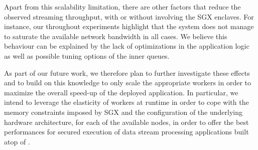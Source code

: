 Apart from this scalability limitation, there are other factors that reduce the observed streaming throughput, with or without involving the SGX enclaves.
For instance, our throughout experiments highlight that the system does not manage to saturate the available network bandwidth in all cases.
We believe this behaviour can be explained by the lack of optimizations in the application logic as well as possible tuning options of the inner \zmq{} queues.

As part of our future work, we therefore plan to further investigate these effects and to build on this knowledge to only scale the appropriate workers in order to maximize the overall speed-up of the deployed application.
In particular, we intend to leverage the elasticity of workers at runtime in order to cope with the memory constraints imposed by SGX and the configuration of the underlying hardware architecture, for each of the available nodes, in order to offer the best performances for secured execution of data stream processing applications built atop of \SS{}.
